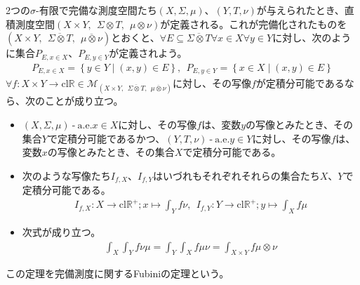 \documentclass[dvipdfmx]{jsarticle}
\begin{document}
\begin{thm}[完備測度に関するFubiniの定理]\label{4.6.4.7}
2つの$\sigma$-有限で完備な測度空間たち$(X,\varSigma,\mu)$、$(Y,T,\nu)$が与えられたとき、直積測度空間$(X \times Y,\ \ \varSigma \otimes T,\ \ \mu \otimes \nu)$が定義される。これが完備化されたものを$\left( X \times Y,\ \ \overline{\varSigma \otimes T},\ \ \overline{\mu \otimes \nu} \right)$とおくと、$\forall E \subseteq \overline{\varSigma \otimes T}\forall x \in X\forall y \in Y$に対し、次のように集合$P_{E,x \in X}$、$P_{E,y \in Y}$が定義されよう。
\begin{align*}
P_{E,x \in X} = \left\{ y \in Y \middle| (x,y) \in E \right\},\ \ P_{E,y \in Y} = \left\{ x \in X \middle| (x,y) \in E \right\}
\end{align*}
$\forall f:X \times Y \rightarrow \mathrm{cl}\mathbb{R} \in \mathcal{M}_{\left( X \times Y,\ \ \overline{\varSigma \otimes T},\ \ \overline{\mu \otimes \nu} \right)}$に対し、その写像$f$が定積分可能であるなら、次のことが成り立つ。
\begin{itemize}
\item
  $(X,\varSigma,\mu) \ \text{-} \ \mathrm{a.e.}x \in X$に対し、その写像$f$は、変数$y$の写像とみたとき、その集合$Y$で定積分可能であるかつ、$(Y,T,\nu) \ \text{-} \ \mathrm{a.e.}y \in Y$に対し、その写像$f$は、変数$x$の写像とみたとき、その集合$X$で定積分可能である。
\item
  次のような写像たち$I_{f,X}$、$I_{f,Y}$はいづれもそれぞれそれらの集合たち$X$、$Y$で定積分可能である。
\begin{align*}
I_{f,X}:X \rightarrow \mathrm{cl}\mathbb{R}^{+};x \mapsto \int_{Y} {f\nu},\ \ I_{f,Y}:Y \rightarrow \mathrm{cl}\mathbb{R}^{+};y \mapsto \int_{X} {f\mu}
\end{align*}
\item
  次式が成り立つ。
\begin{align*}
\int_{X} {\int_{Y} {f\nu}\mu} = \int_{Y} {\int_{X} {f\mu}\nu} = \int_{X \times Y} {f\mu \otimes \nu}
\end{align*}
\end{itemize}
この定理を完備測度に関するFubiniの定理という。
\end{thm}
\end{document}
